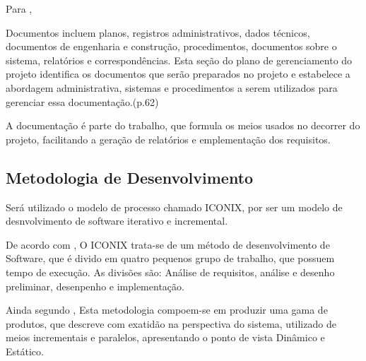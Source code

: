 \par Para ,
\begin{citacao}
	Documentos incluem planos, registros administrativos, dados técnicos, documentos
	de engenharia e construção, procedimentos, documentos sobre o sistema,
	relatórios e correspondências. Esta seção do plano de gerenciamento do
	projeto identifica os documentos que serão preparados no projeto e estabelece
	a abordagem administrativa, sistemas e procedimentos a serem utilizados para
	gerenciar essa documentação.(p.62)
\end{citacao}

\par A documentação é parte do trabalho, que formula os meios usados no decorrer do projeto,
facilitando a geração de relatórios e emplementação dos requisitos.


\subsection{Metodologia de Desenvolvimento}

\par Será utilizado o modelo de processo chamado ICONIX, por ser um modelo de desnvolvimento
de software iterativo e incremental.

\par De acordo com , O ICONIX trata-se de um método de desenvolvimento
de Software, que é divido em quatro pequenos grupo de trabalho, que possuem tempo
de execução. As divisões são: Análise de requisitos, análise e desenho preliminar, desenpenho
e implementação.

\par Ainda segundo , Esta metodologia compoem-se em
produzir uma gama de produtos, que descreve com exatidão na perspectiva do sistema, utilizado de meios
incrementais e paralelos, apresentando o ponto de vista Dinâmico e Estático.












